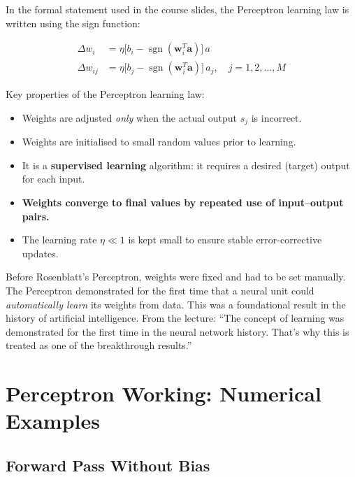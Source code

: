 \documentclass[12pt,a4paper]{article}
\newcommand{\vect}[1]{\mathbf{#1}}
\newcommand{\sgn}{\operatorname{sgn}}
\begin{document}
In the formal statement used in the course slides, the Perceptron
learning law is written using the sign function:

\begin{align}
  \Delta w_i &= \eta\bigl[b_i - \sgn(\vect{w}_i^T \vect{a})\bigr]\,a
  \label{eq:discrete-law-1}\\
  \Delta w_{ij} &= \eta\bigl[b_j - \sgn(\vect{w}_i^T \vect{a})\bigr]\,a_j,
    \quad j = 1, 2, \ldots, M
  \label{eq:discrete-law-2}
\end{align}

Key properties of the Perceptron learning law:
\begin{itemize}
  \item Weights are adjusted \emph{only} when the actual output $s_j$
        is incorrect.
  \item Weights are initialised to small random values prior to learning.
  \item It is a \textbf{supervised learning} algorithm: it requires a
        desired (target) output for each input.
  \item \textbf{Weights converge to final values by repeated use of
        input--output pairs.}
  \item The learning rate $\eta \ll 1$ is kept small to ensure stable
        error-corrective updates.
\end{itemize}

\begin{keyinsight}[title=The Breakthrough of Learning]
Before Rosenblatt's Perceptron, weights were fixed and had to be set
manually.
The Perceptron demonstrated for the first time that a neural unit could
\emph{automatically learn} its weights from data.
This was a foundational result in the history of artificial intelligence.
From the lecture: ``The concept of learning was demonstrated for the
first time in the neural network history. That's why this is treated as
one of the breakthrough results.''
\end{keyinsight}

\section{Perceptron Working: Numerical Examples}
\label{sec:perceptron-examples}

\subsection{Forward Pass Without Bias}
\label{subsec:no-bias}
\end{document}
